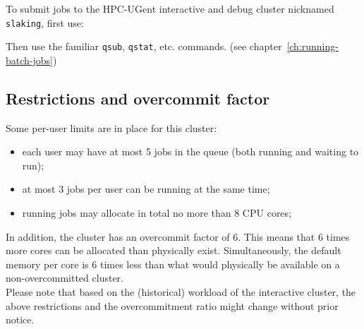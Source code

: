 To submit jobs to the HPC-UGent interactive and debug cluster nicknamed \lstinline|slaking|, first use:

\begin{prompt}
\end{prompt}

Then use the familiar \lstinline|qsub|, \lstinline|qstat|, etc. commands. (see chapter~\ref{ch:running-batch-jobs})

\subsection{Restrictions and overcommit factor}
\label{subsec:interactive_ugent_restrictions}

Some per-user limits are in place for this cluster:
\begin{itemize}
  \item each user may have at most 5 jobs in the queue (both running and waiting to run);
  \item at most 3 jobs per user can be running at the same time;
  \item running jobs may allocate in total no more than 8 CPU cores;
\end{itemize}

In addition, the cluster has an overcommit factor of 6. This means that 6 times more cores
can be allocated than physically exist. Simultaneously, the default memory per core is 6
times less than what would physically be available on a non-overcommitted cluster.
 \\
Please note that based on the (historical) workload of the interactive cluster, the above
restrictions and the overcommitment ratio might change without prior notice.
